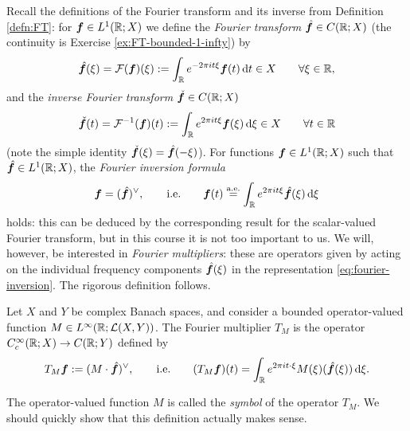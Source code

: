 Recall the definitions of the Fourier transform and its inverse from Definition \ref{defn:FT}: for $\bm{f} \in L^1(\mathbb{R};X)$ we define the \emph{Fourier transform} $\hat{\bm{f}} \in C(\mathbb{R};X)$ (the continuity is Exercise \ref{ex:FT-bounded-1-infty}) by 
  \begin{equation*}
    \hat{\bm{f}}(\xi) = \mathcal{F}(\bm{f})(\xi) := \int_{\mathbb{R}} e^{-2\pi i t \xi} \bm{f}(t)  \, \mathrm{d} t \in X \qquad \forall \xi \in \mathbb{R},
  \end{equation*}
  and the \emph{inverse Fourier transform} $\check{\bm{f}} \in C(\mathbb{R};X)$
  \begin{equation*}
    \check{\bm{f}}(t) = \mathcal{F}^{-1}(\bm{f})(t) := \int_{\mathbb{R}} e^{2\pi i t \xi} \bm{f}(\xi) \, \mathrm{d} \xi \in X \qquad \forall t \in \mathbb{R}
  \end{equation*}
  (note the simple identity $\check{\bm{f}}(\xi) = \hat{\bm{f}}(-\xi)$).
  For functions $\bm{f} \in L^1(\mathbb{R};X)$ such that $\hat{\bm{f}} \in L^1(\mathbb{R};X)$, the \emph{Fourier inversion formula}
  \begin{equation}\label{eq:fourier-inversion}
    \bm{f} = (\hat{\bm{f}})^\vee, \qquad \text{i.e.} \qquad \bm{f}(t) \stackrel{\mathrm{a.e.}}{=} \int_{\mathbb{R}} e^{2\pi i t \xi} \hat{\bm{f}}(\xi)  \, \mathrm{d}\xi
  \end{equation}
  holds: this can be deduced by the corresponding result for the scalar-valued Fourier transform, but in this course it is not too important to us.
  We will, however, be interested in \emph{Fourier multipliers}: these are operators given by acting on the individual frequency components $\hat{\bm{f}}(\xi)$ in the representation \eqref{eq:fourier-inversion}.
  The rigorous definition follows.

\begin{defn}
  Let $X$ and $Y$ be complex Banach spaces, and consider a bounded operator-valued function $M \in L^\infty(\mathbb{R};\mathcal{L}(X,Y))$.
  The Fourier multiplier $T_{M}$ is the operator $C^{\infty}_{c}(\mathbb{R};X) \to C(\mathbb{R};Y)$ defined by
  \begin{equation*}
    T_{M}\bm{f} := (M \cdot \hat{\bm{f}})^{\vee}, \qquad \text{i.e.} \qquad (T_{M}\bm{f})(t) = \int_{\mathbb{R}} e^{2\pi i t \cdot \xi} M(\xi)(\hat{\bm{f}}(\xi))  \, \mathrm{d}\xi.
  \end{equation*}
\end{defn}

The operator-valued function $M$ is called the \emph{symbol} of the operator $T_{M}$.
We should quickly show that this definition actually makes sense.

